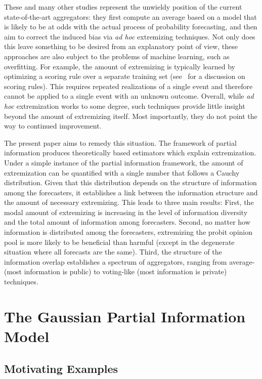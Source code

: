 \documentclass[11pt]{article}
\theoremstyle{definition}
\theoremstyle{definition}
\begin{document}
These and many other studies represent the unwieldy position of the
 current state-of-the-art aggregators: they first compute an average 
 based on a model that is
likely to be at odds with the actual process of probability
forecasting, and  then aim to correct the induced bias  via {\em ad hoc}
extremizing techniques.
%
Not only does this leave something to be desired from an explanatory
point of view, these approaches are also subject to the problems of
machine learning, such as overfitting.  For example, the amount of 
extremizing is typically learned by optimizing a
scoring rule over a separate training set
(see~\citealt{Gneiting04strictlyproper} for a discussion on scoring
rules).  This requires repeated realizations
of a single event and therefore cannot be applied to a single event with an unknown outcome. Overall, while {\em ad hoc}
extremization works to some degree, such techniques provide little
insight beyond the amount of extremizing itself. Most importantly, they do not point
the way to continued improvement.

The present paper aims to remedy this situation.  The framework of
partial information produces theoretically based estimators which
explain extremization. Under a simple instance of the partial
information framework, the amount of extremization can be quantified
with a single number that follows a Cauchy distribution.  Given that
this distribution depends on the structure of information among the
forecasters, it establishes a link between the information structure
and the amount of necessary extremizing.  This leads to three main results:  First, the modal
amount of extremizing is increasing in the level of information
diversity and the total amount of information among forecasters.
Second, no matter how information is distributed among the forecasters,
extremizing the probit opinion pool is more likely to be beneficial
than harmful (except in the degenerate situation where all forecasts
are the same). Third, the structure of the information overlap establishes a spectrum of aggregators, ranging from
average- (most information is public) to voting-like (most information
is private) techniques.


\section{The Gaussian Partial Information Model}
\label{sec:model}

\subsection{Motivating Examples}
\end{document}
